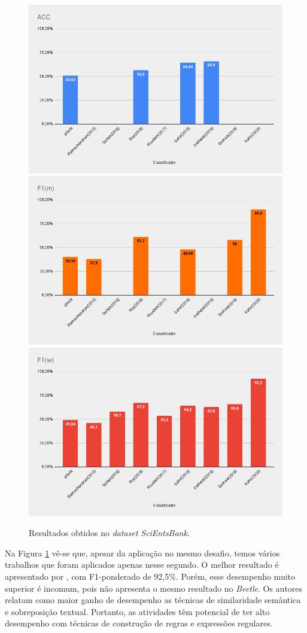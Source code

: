 \begin{figure}[!h]
\centering
\includegraphics[width=.6\textwidth]{figuras/seb/res-seb-acc.png}
\includegraphics[width=.6\textwidth]{figuras/seb/res-seb-mfs.png}
\includegraphics[width=.6\textwidth]{figuras/seb/res-seb-wfs.png}
\caption{Resultados obtidos no \textit{dataset} \textit{SciEntsBank}.}
\label{fig-semeval-seb}
\end{figure}


Na Figura \ref{fig-semeval-seb} vê-se que, apesar da aplicação no mesmo desafio, temos vários trabalhos que foram aplicados apenas nesse segundo. O melhor resultado é apresentado por \cite{sahu2020}, com F1-ponderado de 92,5\%. Porém, esse desempenho muito superior é incomum, pois não apresenta o mesmo resultado no \textit{Beetle}. Os autores relatam como maior ganho de desempenho as técnicas de similaridade semântica e sobreposição textual. Portanto, as atividades têm potencial de ter alto desempenho com técnicas de construção de regras e expressões regulares.

